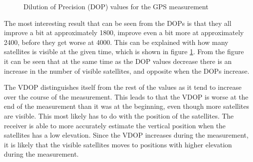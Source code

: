 \documentclass{article}
\begin{document}
\begin{figure}[!ht]
    \centering
    \caption{Dilution of Precision (DOP) values for the GPS measurement}
    \label{fig:no_satellites}
\end{figure}

The most interesting result that can be seen from the DOPs is that they all improve a bit at approximately 1800, improve even a bit more at approximately 2400, before they get worse at 4000. This can be explained with how many satellites is visible at the given time, which is shown in figure \ref{fig:no_satellites}. From the figure it can be seen that at the same time as the DOP values decrease there is an increase in the number of visible satellites, and opposite when the DOPs increase.

The VDOP distinguishes itself from the rest of the values as it tend to increase over the course of the measurement. This leads to that the VDOP is worse at the end of the measurement than it was at the beginning, even though more satellites are visible. This most likely has to do with the position of the satellites. The receiver is able to more accurately estimate the vertical position when the satellites has a low elevation. Since the VDOP increases during the measurement, it is likely that the visible satellites moves to positions with higher elevation during the measurement.
\end{document}

